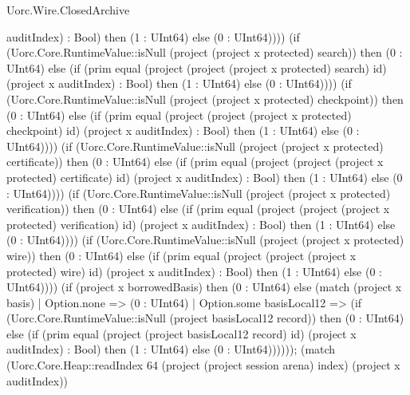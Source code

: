 \begin{lexlean}{Uorc.Wire.ClosedArchive}
\begin{semanticmodule}
{auditIndex) : Bool) then (1 : UInt64) else (0 : UInt64)))) (if (Uorc.Core.RuntimeValue::isNull (project (project x protected) search)) then (0 : UInt64) else (if (prim equal (project (project (project x protected) search) id) (project x auditIndex) : Bool) then (1 : UInt64) else (0 : UInt64)))) (if (Uorc.Core.RuntimeValue::isNull (project (project x protected) checkpoint)) then (0 : UInt64) else (if (prim equal (project (project (project x protected) checkpoint) id) (project x auditIndex) : Bool) then (1 : UInt64) else (0 : UInt64)))) (if (Uorc.Core.RuntimeValue::isNull (project (project x protected) certificate)) then (0 : UInt64) else (if (prim equal (project (project (project x protected) certificate) id) (project x auditIndex) : Bool) then (1 : UInt64) else (0 : UInt64)))) (if (Uorc.Core.RuntimeValue::isNull (project (project x protected) verification)) then (0 : UInt64) else (if (prim equal (project (project (project x protected) verification) id) (project x auditIndex) : Bool) then (1 : UInt64) else (0 : UInt64)))) (if (Uorc.Core.RuntimeValue::isNull (project (project x protected) wire)) then (0 : UInt64) else (if (prim equal (project (project (project x protected) wire) id) (project x auditIndex) : Bool) then (1 : UInt64) else (0 : UInt64)))) (if (project x borrowedBasis) then (0 : UInt64) else (match (project x basis)
    | Option.none => (0 : UInt64)
    | Option.some basisLocal12 => (if (Uorc.Core.RuntimeValue::isNull (project basisLocal12 record)) then (0 : UInt64) else (if (prim equal (project (project basisLocal12 record) id) (project x auditIndex) : Bool) then (1 : UInt64) else (0 : UInt64)))))); (match (Uorc.Core.Heap::readIndex 64 (project (project session arena) index) (project x auditIndex))
}
\end{semanticmodule}
\end{lexlean}
